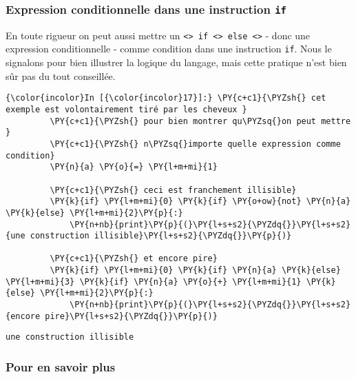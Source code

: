     \hypertarget{expression-conditionnelle-dans-une-instruction-if}{%
\subsubsection{\texorpdfstring{Expression conditionnelle dans une
instruction
\texttt{if}}{Expression conditionnelle dans une instruction if}}\label{expression-conditionnelle-dans-une-instruction-if}}

    En toute rigueur on peut aussi mettre un
\texttt{\textless{}\textgreater{}\ if\ \textless{}\textgreater{}\ else\ \textless{}\textgreater{}}
- donc une expression conditionnelle - comme condition dans une
instruction \texttt{if}. Nous le signalons pour bien illustrer la
logique du langage, mais cette pratique n'est bien sûr pas du tout
conseillée.

    \begin{Verbatim}[commandchars=\\\{\}]
{\color{incolor}In [{\color{incolor}17}]:} \PY{c+c1}{\PYZsh{} cet exemple est volontairement tiré par les cheveux }
         \PY{c+c1}{\PYZsh{} pour bien montrer qu\PYZsq{}on peut mettre }
         \PY{c+c1}{\PYZsh{} n\PYZsq{}importe quelle expression comme condition}
         \PY{n}{a} \PY{o}{=} \PY{l+m+mi}{1}
         
         \PY{c+c1}{\PYZsh{} ceci est franchement illisible}
         \PY{k}{if} \PY{l+m+mi}{0} \PY{k}{if} \PY{o+ow}{not} \PY{n}{a} \PY{k}{else} \PY{l+m+mi}{2}\PY{p}{:}
             \PY{n+nb}{print}\PY{p}{(}\PY{l+s+s2}{\PYZdq{}}\PY{l+s+s2}{une construction illisible}\PY{l+s+s2}{\PYZdq{}}\PY{p}{)}
         
         \PY{c+c1}{\PYZsh{} et encore pire}
         \PY{k}{if} \PY{l+m+mi}{0} \PY{k}{if} \PY{n}{a} \PY{k}{else} \PY{l+m+mi}{3} \PY{k}{if} \PY{n}{a} \PY{o}{+} \PY{l+m+mi}{1} \PY{k}{else} \PY{l+m+mi}{2}\PY{p}{:}
             \PY{n+nb}{print}\PY{p}{(}\PY{l+s+s2}{\PYZdq{}}\PY{l+s+s2}{encore pire}\PY{l+s+s2}{\PYZdq{}}\PY{p}{)}
\end{Verbatim}


    \begin{Verbatim}[commandchars=\\\{\}]
une construction illisible

    \end{Verbatim}

    \hypertarget{pour-en-savoir-plus}{%
\subsubsection{Pour en savoir plus}\label{pour-en-savoir-plus}}

